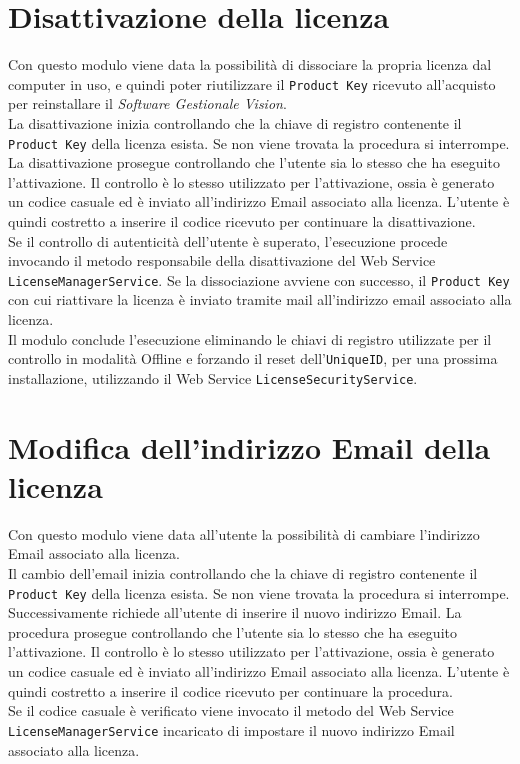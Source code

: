 \section{Disattivazione della licenza}

Con questo modulo viene data la possibilità di dissociare la propria licenza dal computer in uso, e quindi poter riutilizzare il \texttt{Product Key} ricevuto all’acquisto per reinstallare il \textit{Software Gestionale Vision}.\\
La disattivazione inizia controllando che la chiave di registro contenente il \texttt{Product Key} della licenza esista. Se non viene trovata la procedura si interrompe.\\
La disattivazione prosegue controllando che l'utente sia lo stesso che ha eseguito l'attivazione. Il controllo è lo stesso utilizzato per l'attivazione, ossia è generato un codice casuale ed è inviato all'indirizzo Email associato alla licenza. L'utente è quindi costretto a inserire il codice ricevuto per continuare la disattivazione.
\\Se il controllo di autenticità dell'utente è superato, l’esecuzione procede invocando il metodo responsabile della disattivazione del Web Service \texttt{LicenseManagerService}. Se la dissociazione  avviene con successo, il \texttt{Product Key} con cui riattivare la licenza è inviato tramite mail all’indirizzo email associato alla licenza.\\
Il modulo conclude l'esecuzione eliminando le chiavi di registro utilizzate per il controllo in modalità Offline e forzando il reset dell’\texttt{UniqueID}, per una prossima installazione, utilizzando il Web Service \texttt{LicenseSecurityService}. 



\section{Modifica dell'indirizzo Email della licenza}

Con questo modulo viene data all'utente la possibilità di cambiare l'indirizzo Email associato alla licenza.\\
Il cambio dell’email inizia controllando che la chiave di registro contenente il \texttt{Product Key} della licenza esista. Se non viene trovata la procedura si interrompe. Successivamente richiede all'utente di inserire il nuovo indirizzo Email. La procedura prosegue controllando che l'utente sia lo stesso che ha eseguito l'attivazione. Il controllo è lo stesso utilizzato per l'attivazione, ossia è generato un codice casuale ed è inviato all'indirizzo Email associato alla licenza. L'utente è quindi costretto a inserire il codice ricevuto per continuare la procedura.\\
Se il codice casuale è verificato viene invocato il metodo del Web Service\\ \texttt{LicenseManagerService} incaricato di impostare il nuovo indirizzo Email associato alla licenza.

